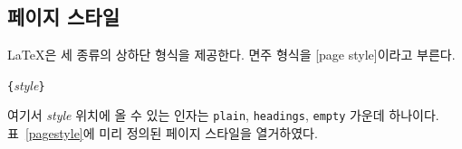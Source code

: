 \subsection{페이지 스타일}

\LaTeX 은 세 종류의 상하단  형식을 제공한다. 
면주 형식을 [page style]이라고 부른다.
\begin{lscommand}
\verb|{|\emph{style}\verb|}|
\end{lscommand}
\noindent 여기서 \emph{style} 위치에 올 수 있는 인자는 \texttt{plain},
\texttt{headings},
\texttt{empty}
가운데 하나이다.
표~\ref{pagestyle}에 미리 정의된 페이지 스타일을 열거하였다.





